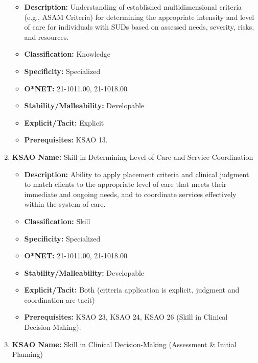 \documentclass[
  letterpaper,
  DIV=11,
  numbers=noendperiod]{scrartcl}
\providecommand{\tightlist}{%
  \setlength{\itemsep}{0pt}\setlength{\parskip}{0pt}}
\begin{document}
\begin{enumerate}
  \begin{itemize}
  \tightlist
  \item
    \textbf{Description:} Understanding of established multidimensional
    criteria (e.g., ASAM Criteria) for determining the appropriate
    intensity and level of care for individuals with SUDs based on
    assessed needs, severity, risks, and resources.
  \item
    \textbf{Classification:} Knowledge
  \item
    \textbf{Specificity:} Specialized
  \item
    \textbf{O*NET:} 21-1011.00, 21-1018.00
  \item
    \textbf{Stability/Malleability:} Developable
  \item
    \textbf{Explicit/Tacit:} Explicit
  \item
    \textbf{Prerequisites:} KSAO 13.
  \end{itemize}
\item
  \textbf{KSAO Name:} Skill in Determining Level of Care and Service
  Coordination

  \begin{itemize}
  \tightlist
  \item
    \textbf{Description:} Ability to apply placement criteria and
    clinical judgment to match clients to the appropriate level of care
    that meets their immediate and ongoing needs, and to coordinate
    services effectively within the system of care.
  \item
    \textbf{Classification:} Skill
  \item
    \textbf{Specificity:} Specialized
  \item
    \textbf{O*NET:} 21-1011.00, 21-1018.00
  \item
    \textbf{Stability/Malleability:} Developable
  \item
    \textbf{Explicit/Tacit:} Both (criteria application is explicit,
    judgment and coordination are tacit)
  \item
    \textbf{Prerequisites:} KSAO 23, KSAO 24, KSAO 26 (Skill in Clinical
    Decision-Making).
  \end{itemize}
\item
  \textbf{KSAO Name:} Skill in Clinical Decision-Making (Assessment \&
  Initial Planning)


\end{enumerate}
\end{document}
